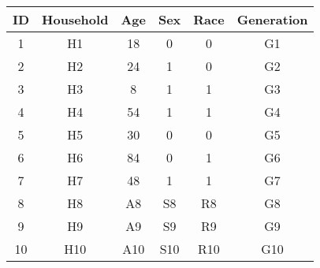 \begin{tabular}{cccccc}
ID & Household & Age & Sex & Race & Generation \\
\hline
\hline
1 & H1 & 18 & 0 & 0 & G1  \\
\hline
2 & H2 & 24 & 1 & 0 & G2  \\
\hline
3 & H3 & 8 & 1 & 1 & G3  \\
\hline
4 & H4 & 54 & 1 & 1 & G4  \\
\hline
5 & H5 & 30 & 0 & 0 & G5  \\
\hline
6 & H6 & 84 & 0 & 1 & G6  \\
\hline
7 & H7 & 48 & 1 & 1 & G7  \\
\hline
8 & H8 & A8 & S8 & R8 & G8  \\
\hline
9 & H9 & A9 & S9 & R9 & G9  \\
\hline
10 & H10 & A10 & S10 & R10 & G10  \\
\hline
\end{tabular}
